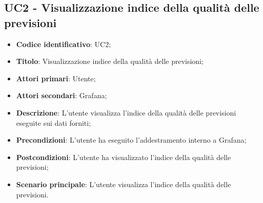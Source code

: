 \subsection{UC2 - Visualizzazione indice della qualità delle previsioni}
\begin{itemize}
	\item \textbf{Codice identificativo}: UC2;
	\item \textbf{Titolo}: Visualizzazione indice della qualità delle previsioni;
	\item \textbf{Attori primari}: Utente;
	\item \textbf{Attori secondari}: Grafana\glo;
	\item \textbf{Descrizione}: L'utente visualizza l'indice della qualità delle previsioni eseguite sui dati forniti;
	\item \textbf{Precondizioni}: L'utente ha eseguito l'addestramento interno a Grafana;
	\item \textbf{Postcondizioni}: L'utente ha visualizzato l'indice della qualità delle previsioni;
	\item \textbf{Scenario principale}: L'utente visualizza l'indice della qualità delle previsioni.
\end{itemize}